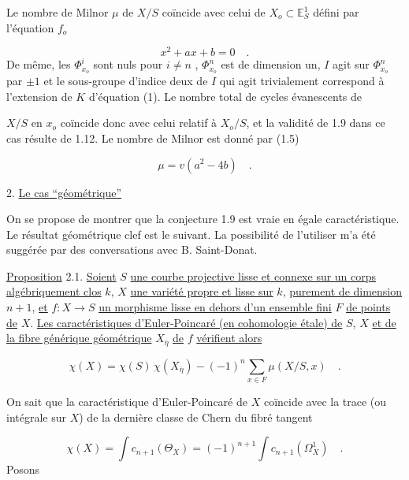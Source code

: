 Le nombre de Milnor $\mu$ de $X/S$ coïncide avec celui de $X_o \subset \mathbb{E}_S^1$ défini par l'équation $f_o$

\begin{equation}\tag{1}
x^2 + ax + b = 0 \quad .
\end{equation}
De même, les $\Phi^i_{x_o}$ sont nuls pour $i \neq n$ , $\Phi^n_{x_o}$ est de dimension un, $I$ agit sur $\Phi^n_{x_o}$ par $\pm 1$ et le sous-groupe d'indice deux de $I$ qui agit trivialement correspond à l'extension de $K$ d'équation (1). Le nombre total de cycles évanescents de 



$X/S$ en $x_o$ coïncide donc avec celui relatif à $X_o/S$, et la validité de 1.9 dans ce cas résulte de 1.12. Le nombre de Milnor est donné par (1.5)

\begin{equation}\tag{1.13.1}
\mu=v(a^2-4b) \quad .
\end{equation}

2. \underline{Le cas ``géométrique''}

On se propose de montrer que la conjecture 1.9 est vraie en égale caractéristique. Le résultat géométrique clef est le suivant. La possibilité de l'utiliser m'a été suggérée par des conversations avec B. Saint-Donat.

\underline{Proposition} 2.1. \underline{Soient} $S$ \underline{une courbe projective lisse et connexe sur un corps algébriquement clos} $k$, $X$ \underline{une variété propre et lisse sur} $k$, \underline{purement de dimension} $n+1$, \underline{et} $f:X\to S$ \underline{un morphisme lisse en dehors d'un ensemble fini} $F$ \underline{de points de} $X$. \underline{Les caractéristiques d'Euler-Poincaré (en cohomologie étale) de} $S$, $X$ \underline{et de la fibre générique géométrique} $X_{\bar\eta}$ \underline{de} $f$ \underline{vérifient alors}

\begin{equation}\tag{2.1.1}
\chi(X)=\chi(S)\,\chi(X_{\bar\eta})-(-1)^n\sum_{x\in F}\mu(X/S,x) \quad .
\end{equation}

On sait que la caractéristique d'Euler-Poincaré de $X$ coïncide avec la trace (ou intégrale sur $X$) de la dernière classe de Chern du fibré tangent

\begin{equation*}
\chi(X)=\int c_{n+1}(\Theta_X)=(-1)^{n+1}\int c_{n+1}(\Omega_X^1) \quad .
\end{equation*}
Posons

